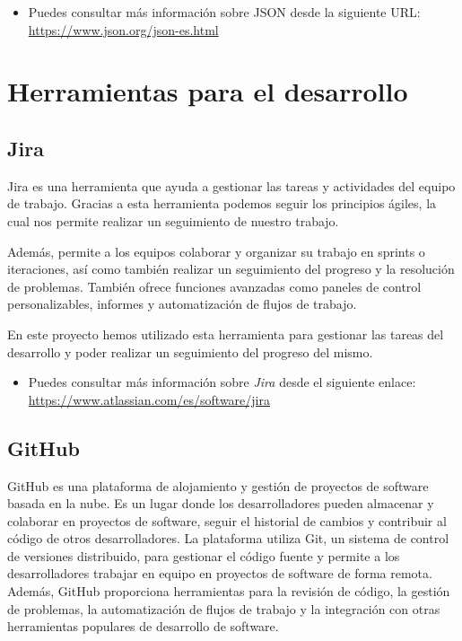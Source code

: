\begin{itemize}
    \item Puedes consultar más información sobre JSON desde la siguiente URL: \url{https://www.json.org/json-es.html}
\end{itemize}
    
\section{Herramientas para el desarrollo}

\subsection{Jira} \label{JIRA}
Jira es una herramienta que ayuda  a gestionar las tareas y actividades del equipo de trabajo. Gracias a esta herramienta podemos seguir los principios ágiles, la cual nos permite realizar un seguimiento de nuestro trabajo.

Además, permite a los equipos colaborar y organizar su trabajo en sprints o iteraciones, así como también realizar un seguimiento del progreso y la resolución de problemas. También ofrece funciones avanzadas como paneles de control personalizables, informes y automatización de flujos de trabajo.

En este proyecto hemos utilizado esta herramienta para gestionar las tareas del desarrollo y poder realizar un seguimiento del progreso del mismo.

\begin{itemize}
    \item Puedes consultar más información sobre   \textit{Jira}  desde el siguiente enlace: \url{https://www.atlassian.com/es/software/jira}
\end{itemize}


\subsection{GitHub} \label{GITHUB}

GitHub es una plataforma de alojamiento y gestión de proyectos de software basada en la nube. Es un lugar donde los desarrolladores pueden almacenar y colaborar en proyectos de software, seguir el historial de cambios y contribuir al código de otros desarrolladores. La plataforma utiliza Git, un sistema de control de versiones distribuido, para gestionar el código fuente y permite a los desarrolladores trabajar en equipo en proyectos de software de forma remota. Además, GitHub proporciona herramientas para la revisión de código, la gestión de problemas, la automatización de flujos de trabajo y la integración con otras herramientas populares de desarrollo de software.

